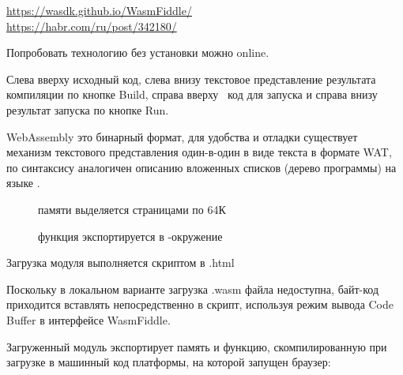 
\noindent
\url{https://wasdk.github.io/WasmFiddle/}\\
\url{https://habr.com/ru/post/342180/}
\bigskip

Попробовать технологию без установки можно online.

\bigskip
{}

Слева вверху исходный код, слева внизу текстовое представление результата
компиляции по кнопке Build, справа вверху \js\ код для запуска и справа
внизу результат запуска по кнопке Run.

WebAssembly это бинарный формат, для удобства и отладки существует механизм
текстового представления один-в-один в виде текста в формате WAT, по синтаксису
аналогичен описанию вложенных списков (дерево программы) на языке \lisp.

\begin{description}
\item[] памяти выделяется страницами по 64К
\item[] функция экспортируется в
\js-окружение
\end{description}

Загрузка модуля выполняется скриптом в .html

Поскольку в локальном варианте загрузка .wasm файла недоступна, байт-код
приходится вставлять непосредственно в скрипт, используя режим вывода Code
Buffer в интерфейсе WasmFiddle.

Загруженный модуль экспортирует память и функцию, скомпилированную при загрузке
в машинный код платформы, на которой запущен браузер:\\
